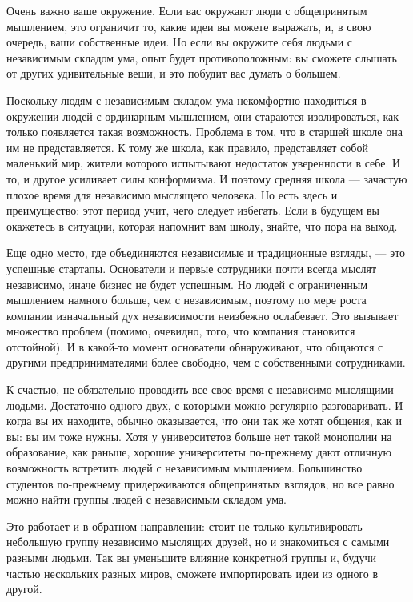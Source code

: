 \documentclass[ebook,12pt,oneside,openany]{memoir}
\begin{document}
Очень важно ваше окружение. Если вас окружают люди с общепринятым
мышлением, это ограничит то, какие идеи вы можете выражать, и, в свою
очередь, ваши собственные идеи. Но если вы окружите себя людьми с
независимым складом ума, опыт будет противоположным: вы сможете
слышать от других удивительные вещи, и это побудит вас думать о
большем. \newline

Поскольку людям с независимым складом ума некомфортно находиться в
окружении людей с ординарным мышлением, они стараются изолироваться,
как только появляется такая возможность. Проблема в том, что в старшей
школе она им не представляется. К тому же школа, как правило,
представляет собой маленький мир, жители которого испытывают
недостаток уверенности в себе. И то, и другое усиливает силы
конформизма. И поэтому средняя школа — зачастую плохое время для
независимо мыслящего человека. Но есть здесь и преимущество: этот
период учит, чего следует избегать. Если в будущем вы окажетесь в
ситуации, которая напомнит вам школу, знайте, что пора на выход. \newline

Еще одно место, где объединяются независимые и традиционные взгляды, —
это успешные стартапы. Основатели и первые сотрудники почти всегда
мыслят независимо, иначе бизнес не будет успешным. Но людей с
ограниченным мышлением намного больше, чем с независимым, поэтому по
мере роста компании изначальный дух независимости неизбежно
ослабевает. Это вызывает множество проблем (помимо, очевидно, того,
что компания становится отстойной). И в какой-то момент основатели
обнаруживают, что общаются с другими предпринимателями более свободно,
чем с собственными сотрудниками. \newline

К счастью, не обязательно проводить все свое время с независимо
мыслящими людьми. Достаточно одного-двух, с которыми можно регулярно
разговаривать. И когда вы их находите, обычно оказывается, что они так
же хотят общения, как и вы: вы им тоже нужны. Хотя у университетов
больше нет такой монополии на образование, как раньше, хорошие
университеты по-прежнему дают отличную возможность встретить людей с
независимым мышлением. Большинство студентов по-прежнему
придерживаются общепринятых взглядов, но все равно можно найти группы
людей с независимым складом ума. \newline

Это работает и в обратном направлении: стоит не только культивировать
небольшую группу независимо мыслящих друзей, но и знакомиться с самыми
разными людьми. Так вы уменьшите влияние конкретной группы и, будучи
частью нескольких разных миров, сможете импортировать идеи из одного в
другой. \newline
\end{document}
